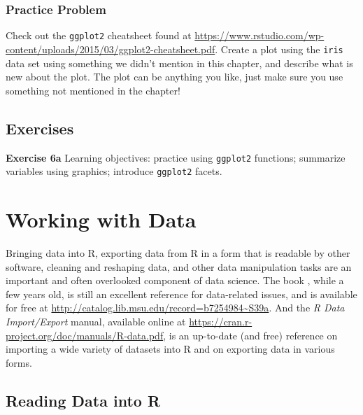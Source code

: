 \documentclass[
]{krantz}
\begin{document}
\hypertarget{practice-problem-5}{%
\subsection{Practice Problem}\label{practice-problem-5}}

Check out the \texttt{ggplot2} cheatsheet found at \url{https://www.rstudio.com/wp-content/uploads/2015/03/ggplot2-cheatsheet.pdf}. Create a plot using the \texttt{iris} data set using something we didn't mention in this chapter, and describe what is new about the plot. The plot can be anything you like, just make sure you use something not mentioned in the chapter!

\hypertarget{exercises-2}{%
\section{Exercises}\label{exercises-2}}

\textbf{Exercise 6a} Learning objectives: practice using \texttt{ggplot2} functions; summarize variables using graphics; introduce \texttt{ggplot2} facets.

\hypertarget{data2}{%
\chapter{Working with Data}\label{data2}}

Bringing data into R, exporting data from R in a form that is readable by other software, cleaning and reshaping data, and other data manipulation tasks are an important and often overlooked component of data science. The book \citet{SpectorDataManipulation}, while a few years old, is still an excellent reference for data-related issues, and is available for free at \url{http://catalog.lib.msu.edu/record=b7254984~S39a}. And the \emph{R Data Import/Export} manual, available online at \url{https://cran.r-project.org/doc/manuals/R-data.pdf}, is an up-to-date (and free) reference on importing a wide variety of datasets into R and on exporting data in various forms.

\hypertarget{reading-data-into-r}{%
\section{Reading Data into R}\label{reading-data-into-r}}
\end{document}
